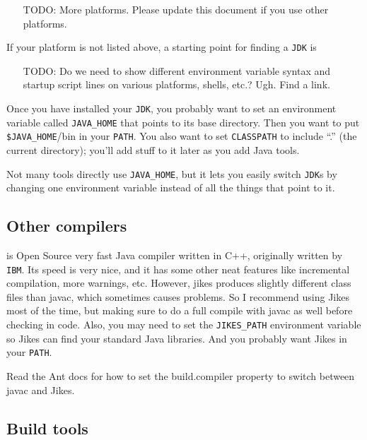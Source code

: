 \documentclass{article}
\begin{document}
\begin{itemize}
\item[TODO:] More platforms. Please update this document if you use
other platforms.
\end{itemize}

If your platform is not listed above, a starting point for finding a
\texttt{JDK} is 

\begin{itemize}
\item[TODO:] Do we need to show different environment variable syntax and
startup script lines on various platforms, shells, etc.? Ugh. Find a link.
\end{itemize}

Once you have installed your \texttt{JDK}, you probably want to set an
environment variable called \texttt{JAVA\_HOME} that points to its base
directory. Then you want to put \texttt{\$JAVA\_HOME}/bin in your
\texttt{PATH}. You also want to set \texttt{CLASSPATH} to include ``.''
(the current directory); you'll add stuff to it later as you add Java tools.

Not many tools directly use \texttt{JAVA\_HOME}, but it lets you easily
switch \texttt{JDK}s by changing one environment variable instead of all
the things that point to it.

\subsection{Other compilers}

 is Open Source very fast Java compiler
written in C++, originally
written by \texttt{IBM}. Its speed is very nice, and it has some other neat 
features like incremental compilation, more warnings, etc. However, 
jikes produces slightly different class files than javac, which 
sometimes causes problems. So I recommend using Jikes most of the time,
but making sure to do a full compile with javac as well before checking
in code.
Also, you may need to set the \texttt{JIKES\_PATH} environment variable so
Jikes can find your standard Java libraries. And you probably want Jikes in
your \texttt{PATH}.

Read the Ant docs for how to set the build.compiler property to 
switch between javac and Jikes.

\subsection{Build tools}
\end{document}
